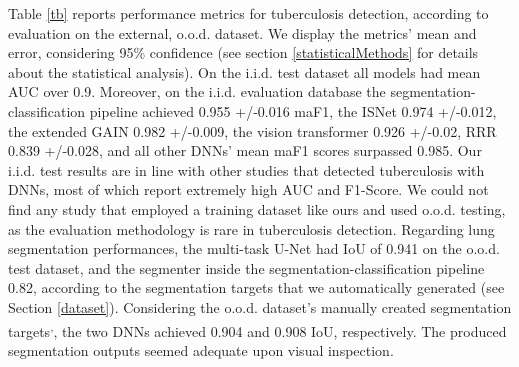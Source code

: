 \documentclass[fleqn,10pt]{wlscirep}
\begin{document}
{Table \ref{tb} reports performance metrics for tuberculosis detection, according to evaluation on the external, o.o.d. dataset. We display the metrics' mean and error, considering 95\% confidence (see section \ref{statisticalMethods} for details about the statistical analysis). On the i.i.d. test dataset all models had mean AUC over 0.9. Moreover, on the i.i.d. evaluation database the segmentation-classification pipeline achieved 0.955 +/-0.016 maF1, the ISNet 0.974 +/-0.012, the extended GAIN 0.982 +/-0.009, the vision transformer 0.926 +/-0.02, RRR 0.839 +/-0.028, and all other DNNs' mean maF1 scores surpassed 0.985. Our i.i.d. test results are in line with other studies that detected tuberculosis with DNNs, most of which report extremely high AUC and F1-Score\cite{TBReview}. We could not find any study that employed a training dataset like ours and used o.o.d. testing, as the evaluation methodology is rare in tuberculosis detection. Regarding lung segmentation performances, the multi-task U-Net had IoU of 0.941 on the o.o.d. test dataset, and the segmenter inside the segmentation-classification pipeline 0.82, according to the segmentation targets that we automatically generated (see Section \ref{dataset}). Considering the o.o.d. dataset's manually created segmentation targets\cite{ChineseDataset1}\textsuperscript{,}\cite{ShenMasks}, the two DNNs achieved 0.904 and 0.908 IoU, respectively. The produced segmentation outputs seemed adequate upon visual inspection.


}
\end{document}
